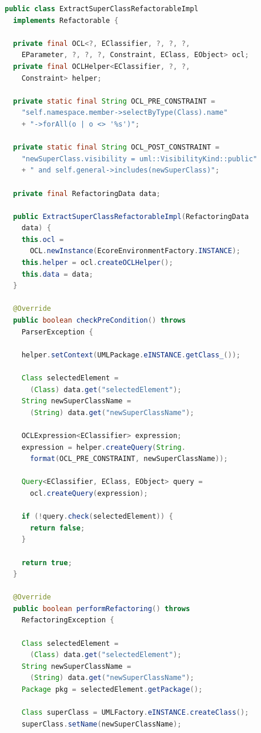 \documentclass{llncs}
\begin{document}
\begin{lstlisting}[language=Java,caption=Source code of the \textit{extract superClass} refactoring,label=lst:extractSuperclass]
public class ExtractSuperClassRefactorableImpl 
  implements Refactorable {

  private final OCL<?, EClassifier, ?, ?, ?, 
    EParameter, ?, ?, ?, Constraint, EClass, EObject> ocl;
  private final OCLHelper<EClassifier, ?, ?, 
    Constraint> helper;

  private static final String OCL_PRE_CONSTRAINT =
    "self.namespace.member->selectByType(Class).name"
    + "->forAll(o | o <> '%s')";

  private static final String OCL_POST_CONSTRAINT = 
    "newSuperClass.visibility = uml::VisibilityKind::public"
    + " and self.general->includes(newSuperClass)";

  private final RefactoringData data;

  public ExtractSuperClassRefactorableImpl(RefactoringData 
    data) {
    this.ocl = 
      OCL.newInstance(EcoreEnvironmentFactory.INSTANCE);
    this.helper = ocl.createOCLHelper();
    this.data = data;
  }

  @Override
  public boolean checkPreCondition() throws 
    ParserException {
    
    helper.setContext(UMLPackage.eINSTANCE.getClass_());

    Class selectedElement = 
      (Class) data.get("selectedElement");
    String newSuperClassName = 
      (String) data.get("newSuperClassName");

    OCLExpression<EClassifier> expression;
    expression = helper.createQuery(String.
      format(OCL_PRE_CONSTRAINT, newSuperClassName));

    Query<EClassifier, EClass, EObject> query = 
      ocl.createQuery(expression);

    if (!query.check(selectedElement)) {
      return false;
    }

    return true;
  }

  @Override
  public boolean performRefactoring() throws 
    RefactoringException {
    
    Class selectedElement = 
      (Class) data.get("selectedElement");
    String newSuperClassName = 
      (String) data.get("newSuperClassName");
    Package pkg = selectedElement.getPackage();

    Class superClass = UMLFactory.eINSTANCE.createClass();
    superClass.setName(newSuperClassName);


\end{lstlisting}
\end{document}
